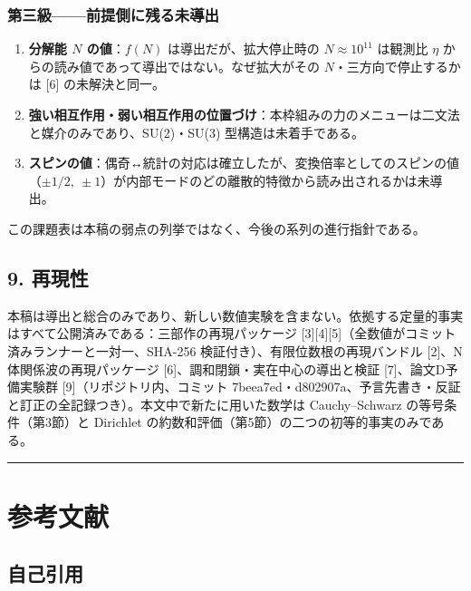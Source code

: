 \documentclass[
  a4paper,
]{ltjsarticle}
\providecommand{\tightlist}{%
  \setlength{\itemsep}{0pt}\setlength{\parskip}{0pt}}
\begin{document}
\subsubsection{第三級------前提側に残る未導出}\label{ux7b2cux4e09ux7d1aux524dux63d0ux5074ux306bux6b8bux308bux672aux5c0eux51fa}

\begin{enumerate}
\def\labelenumi{\arabic{enumi}.}
\setcounter{enumi}{7}
\tightlist
\item
  \textbf{分解能 \(N\) の値}：\(f(N)\) は導出だが、拡大停止時の
  \(N\approx10^{11}\) は観測比 \(\eta\)
  からの読み値であって導出ではない。なぜ拡大がその
  \(N\)・三方向で停止するかは {[}6{]} の未解決と同一。
\item
  \textbf{強い相互作用・弱い相互作用の位置づけ}：本枠組みの力のメニューは二文法と媒介のみであり、SU(2)・SU(3)
  型構造は未着手である。
\item
  \textbf{スピンの値}：偶奇↔統計の対応は確立したが、変換倍率としてのスピンの値（\(\pm1/2,\ \pm1\)）が内部モードのどの離散的特徴から読み出されるかは未導出。
\end{enumerate}

この課題表は本稿の弱点の列挙ではなく、今後の系列の進行指針である。

\subsection{9. 再現性}\label{ux518dux73feux6027}

本稿は導出と総合のみであり、新しい数値実験を含まない。依拠する定量的事実はすべて公開済みである：三部作の再現パッケージ
{[}3{]}{[}4{]}{[}5{]}（全数値がコミット済みランナーと一対一、SHA-256
検証付き）、有限位数根の再現バンドル {[}2{]}、N体関係波の再現パッケージ
{[}6{]}、調和閉鎖・実在中心の導出と検証 {[}7{]}、論文D予備実験群
{[}9{]}（リポジトリ内、コミット
7beea7ed・d802907a、予言先書き・反証と訂正の全記録つき）。本文中で新たに用いた数学は
Cauchy--Schwarz の等号条件（第3節）と Dirichlet
の約数和評価（第5節）の二つの初等的事実のみである。

\begin{center}\rule{0.5\linewidth}{0.5pt}\end{center}

\section{参考文献}\label{ux53c2ux8003ux6587ux732e}

\subsection{自己引用}\label{ux81eaux5df1ux5f15ux7528}
\end{document}
